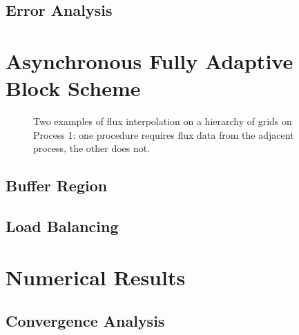 \documentclass[12pt,letterpaper]{article}
\begin{document}
    \subsection*{Error Analysis}


\section{Asynchronous Fully Adaptive Block Scheme}


    \begin{figure}[H]
        \center
        
        \caption{}
    \end{figure}


    \begin{figure}[H]
        \center
        
       \caption{Two examples of flux interpolation on a hierarchy of grids
        on Process 1: one procedure requires flux data from the adjacent
        process, the other does not.}
    \end{figure}

    \subsection*{Buffer Region}

    \subsection*{Load Balancing}

\section{Numerical Results}

    \subsection*{Convergence Analysis}
\end{document}

